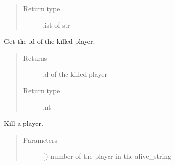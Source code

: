 \documentclass[letterpaper,10pt,english]{sphinxmanual}
\begin{document}
\begin{fulllineitems}
\begin{fulllineitems}
\begin{quote}
\begin{description}
\item[{Return type}] \leavevmode
list of str

\end{description}\end{quote}

\end{fulllineitems}


\begin{fulllineitems}
\label{\detokenize{chatwolf:chatwolf.nightactions.Nightactions.get_killed_id}}
Get the id of the killed player.
\begin{quote}\begin{description}
\item[{Returns}] \leavevmode
id of the killed player

\item[{Return type}] \leavevmode
int

\end{description}\end{quote}

\end{fulllineitems}


\begin{fulllineitems}
\label{\detokenize{chatwolf:chatwolf.nightactions.Nightactions.kill}}
Kill a player.
\begin{quote}\begin{description}
\item[{Parameters}] \leavevmode
{} (\sphinxstyleliteralemphasis{\sphinxupquote{{[}}}\sphinxstyleliteralemphasis{\sphinxupquote{{]}}}) \textendash{} number of the player in the alive\_string

\end{description}\end{quote}

\end{fulllineitems}


\end{fulllineitems}
\end{document}
